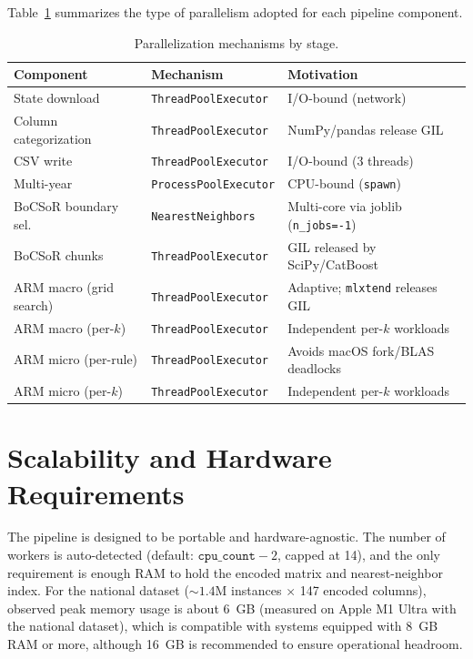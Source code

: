 Table~\ref{tab:parallelism} summarizes the type of parallelism adopted for each pipeline component.
\begin{table}[htbp]
\centering
\renewcommand{\arraystretch}{1.2}
\caption{Parallelization mechanisms by stage.}
\label{tab:parallelism}
\begin{tabular}{>{\raggedright\arraybackslash}p{} p{} p{}}
  \toprule
  \textbf{Component} & \textbf{Mechanism} & \textbf{Motivation} \\
  \midrule
  State download          & \texttt{ThreadPoolExecutor}   & I/O-bound (network) \\
  Column categorization   & \texttt{ThreadPoolExecutor}   & NumPy/pandas release GIL \\
  CSV write               & \texttt{ThreadPoolExecutor}   & I/O-bound (3 threads) \\
  Multi-year              & \texttt{ProcessPoolExecutor}  & CPU-bound (\texttt{spawn}) \\
  BoCSoR boundary sel.    & \texttt{NearestNeighbors}     & Multi-core via joblib (\texttt{n\_jobs=-1}) \\
  BoCSoR chunks           & \texttt{ThreadPoolExecutor}   & GIL released by SciPy/CatBoost \\
  ARM macro (grid search) & \texttt{ThreadPoolExecutor}   & Adaptive; \texttt{mlxtend} releases GIL \\
  ARM macro (per-$k$)     & \texttt{ThreadPoolExecutor}   & Independent per-$k$ workloads \\
  ARM micro (per-rule)    & \texttt{ThreadPoolExecutor}   & Avoids macOS fork/BLAS deadlocks \\
  ARM micro (per-$k$)     & \texttt{ThreadPoolExecutor}   & Independent per-$k$ workloads \\
  \bottomrule
\end{tabular}
\renewcommand{\arraystretch}{1.0}
\end{table}

\section{Scalability and Hardware Requirements}
\label{app:scalability}

The pipeline is designed to be portable and hardware-agnostic.
The number of workers is auto-detected (default: $\texttt{cpu\_count}-2$, capped at 14), and the only requirement is enough RAM to hold the encoded matrix and nearest-neighbor index.
For the national dataset ($\sim\!1.4$M instances $\times$ 147 encoded columns), observed peak memory usage is about 6~GB (measured on Apple M1 Ultra with the national dataset), which is compatible with systems equipped with 8~GB RAM or more, although 16~GB is recommended to ensure operational headroom.
